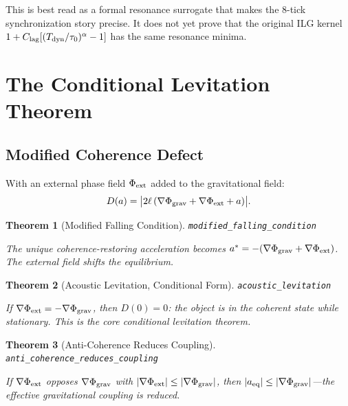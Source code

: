 \documentclass[11pt,a4paper]{article}
\newtheorem{theorem}{Theorem}[section]
\newcommand{\lean}[1]{\texttt{\small #1}}
\begin{document}
\noindent This is best read as a formal resonance surrogate that makes the 8-tick synchronization story precise.
It does not yet prove that the original ILG kernel
$1 + C_{\rm lag}[(T_{\rm dyn}/\tau_0)^\alpha - 1]$
has the same resonance minima.

\section{The Conditional Levitation Theorem}
\label{sec:levitation}

\subsection{Modified Coherence Defect}

With an external phase field $\Phi_{\rm ext}$ added to the gravitational field:
\begin{equation}
    D(a) = \bigl|2\ell\,(\nabla\Phi_{\rm grav} + \nabla\Phi_{\rm ext} + a)\bigr|.
\end{equation}

\begin{theorem}[Modified Falling Condition]
\lean{modified\_falling\_condition}

The unique coherence-restoring acceleration becomes $a^* = -(\nabla\Phi_{\rm grav} + \nabla\Phi_{\rm ext})$.
The external field \emph{shifts} the equilibrium.
\end{theorem}

\begin{theorem}[Acoustic Levitation, Conditional Form]
\lean{acoustic\_levitation}

If $\nabla\Phi_{\rm ext} = -\nabla\Phi_{\rm grav}$, then $D(0) = 0$: the object is in the coherent state while stationary.
This is the core conditional levitation theorem.
\end{theorem}

\begin{theorem}[Anti-Coherence Reduces Coupling]
\lean{anti\_coherence\_reduces\_coupling}

If $\nabla\Phi_{\rm ext}$ opposes $\nabla\Phi_{\rm grav}$ with $|\nabla\Phi_{\rm ext}| \leq |\nabla\Phi_{\rm grav}|$, then
$|a_{\rm eq}| \leq |\nabla\Phi_{\rm grav}|$---the effective gravitational coupling is reduced.
\end{theorem}
\end{document}
